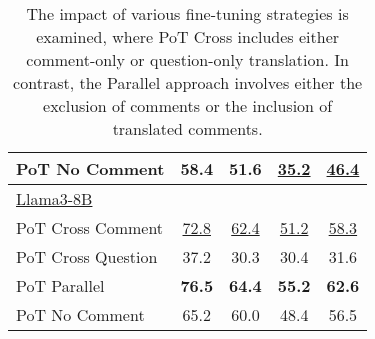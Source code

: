 \begin{table}[htbp]
{\begin{tabular}{l|c|cc|c}
    PoT No Comment & 58.4 & 51.6 & \underline{35.2} & \underline{46.4}  \\ 
    \hline    
    \multicolumn{1}{l|}{\underline{Llama3-8B}}& \multicolumn{1}{c|}{} & \multicolumn{2}{c|}{} & \multicolumn{1}{c}{} \\
    PoT Cross Comment & \underline{72.8} & \underline{62.4} & \underline{51.2}	& \underline{58.3}  \\
    PoT Cross Question & 37.2 & 30.3 & 30.4 & 31.6  \\ 
    PoT Parallel & \textbf{76.5} & \textbf{64.4} & \textbf{55.2} & \textbf{62.6}  \\
    PoT No Comment &  65.2 & 60.0 & 48.4 & 56.5  \\ 
    \hline    
  \end{tabular}
  }
  \caption{
  The impact of various fine-tuning strategies is examined, where PoT Cross includes either comment-only or question-only translation. In contrast, the Parallel approach involves either the exclusion of comments or the inclusion of translated comments.
  }
  \label{tab:multilingual-ablation}
\end{table}











